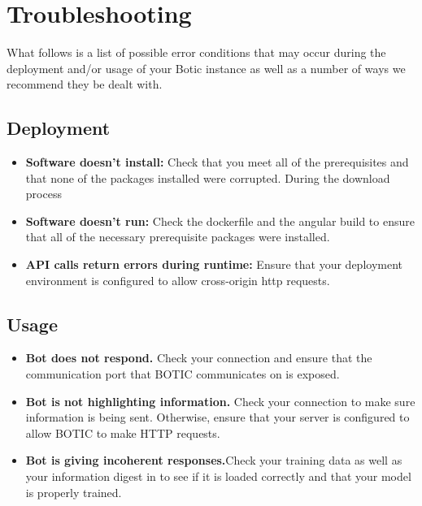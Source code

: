 \documentclass[11pt]{article}
\begin{document}
\section{Troubleshooting}
What follows is a list of possible error conditions that may occur during the deployment and/or usage of your Botic instance as well as a number of ways we recommend they be dealt with.

\subsection{Deployment}
\begin{itemize}
    \item \textbf{Software doesn't install:} Check that you meet all of the prerequisites and that none of the packages installed were corrupted. During the download process
    \item \textbf{Software doesn't run:} Check the dockerfile and the angular build to ensure that all of the necessary prerequisite packages were installed.    
    \item \textbf{API calls return errors during runtime:} Ensure that your deployment environment is configured to allow cross-origin http requests.
\end{itemize}

\subsection {Usage}
\begin{itemize}
        \item \textbf{Bot does not respond.} Check your connection and ensure that the communication port that BOTIC communicates on is exposed.
        \item\textbf{Bot is not highlighting information.} Check your connection to make sure information is being sent. Otherwise, ensure that your server is configured to allow BOTIC to make HTTP requests.
        \item \textbf{Bot is giving incoherent responses.}Check your training data as well as your information digest in to see if it is loaded correctly and that your model is properly trained.
\end{itemize}


    
\end{document}
